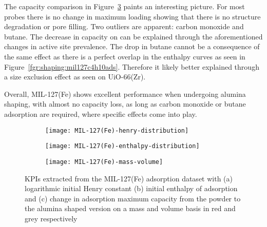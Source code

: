 The capacity comparison in Figure~\ref{fig:shaping:analysismil127basis} 
paints an interesting picture. For most probes there is no change in 
maximum loading showing that there is no structure degradation or 
pore filling. Two outliers are apparent: carbon monoxide and 
butane. The decrease in capacity on  can be explained through the 
aforementioned changes in active site prevalence.
The drop in butane cannot be a consequence of the same effect
as there is a perfect overlap in the enthalpy curves as seen in
Figure~\ref{fgr:shaping:mil127c4h10ads}.
Therefore it likely better explained through a size exclusion 
effect as seen on UiO-66(Zr).

Overall, MIL-127(Fe) shows excellent performance when undergoing
alumina shaping, with almost no capacity loss, as long as
carbon monoxide or butane adsorption are required, where specific effects
come into play.

\begin{figure}
    \centering
    \begin{subfigure}{0.8\textwidth}
        \parbox[c]{0.1\linewidth}{\caption{}%
        \label{fig:shaping:analysismil127henry}}%
        \parbox[b]{0.7\linewidth}{%
        \texttt{[image: MIL-127(Fe)-henry-distribution]}%
        }%
    \end{subfigure}
    
    \begin{subfigure}{0.8\textwidth}
        \parbox[c]{0.1\linewidth}{\caption{}%
        \label{fig:shaping:analysismil127enth}}%
        \parbox[b]{0.7\linewidth}{%
        \texttt{[image: MIL-127(Fe)-enthalpy-distribution]}%
        }%
    \end{subfigure}

    \begin{subfigure}{0.8\textwidth}
        \parbox[c]{0.1\linewidth}{\caption{}%
        \label{fig:shaping:analysismil127basis}}%
        \parbox[b]{0.7\linewidth}{%
        \texttt{[image: MIL-127(Fe)-mass-volume]}%
        }%
    \end{subfigure}
    
    \caption{KPIs extracted from the MIL-127(Fe) adsorption dataset with
    (a) logarithmic initial Henry constant (b) initial enthalpy of 
    adsorption and (c) change in adsorption maximum capacity from the powder
    to the alumina shaped version on a mass and volume basis in red and grey
    respectively}%
    \label{fig:shaping:analysismil127}
\end{figure}